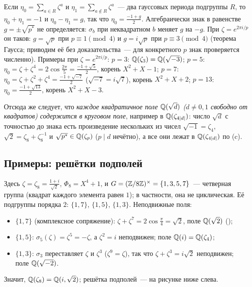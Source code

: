 Если $\eta_0=\sum_{a\in R}\zeta^a$ и $\eta_1=\sum_{a\notin R}\zeta^a$~--- два гауссовых периода подгруппы $R$, то
$\eta_0+\eta_1=-1$ и $\eta_0-\eta_1=g$, так что $\eta_0=\frac{-1+g}2$. Алгебраически знак в равенстве
$g=\pm\sqrt{p^*}$ не определяется: $\sigma_b$ при неквадратном $b$ меняет $g$ на $-g$. При $\zeta=e^{2\pi i/p}$ он таков:
$g=\sqrt p$ при $p\equiv1\pmod4$ и $g=i\sqrt p$ при $p\equiv3\pmod4$ (теорема Гаусса; приводим её без доказательства~---
для конкретного $p$ знак проверяется численно). Примеры при $\zeta=e^{2\pi i/p}$: $p=3$: $\mathbb Q(\zeta_3)=\mathbb Q(\sqrt{-3})$; $p=5$:
$\eta_0=\zeta+\zeta^4=2\cos\frac{2\pi}5=\frac{-1+\sqrt5}2$, корень $X^2+X-1$; $p=7$: $\eta_0=\zeta+\zeta^2+\zeta^4=\frac{-1+\sqrt{-7}}2$
($\sqrt{-7}=i\sqrt7$), корень $X^2+X+2$; $p=13$: $\eta_0=\frac{-1+\sqrt{13}}2$, корень $X^2+X-3$.

Отсюда же следует, что \emph{каждое квадратичное поле $\mathbb Q(\sqrt d)$ ($d\ne0,1$ свободно от квадратов) содержится в
круговом поле}, например в $\mathbb Q(\zeta_{4|d|})$: число $\sqrt d$ с точностью до знака есть произведение нескольких из чисел
$\sqrt{-1}=\zeta_4$, $\sqrt2=\zeta_8+\zeta_8^{-1}$ и $\sqrt{p^*}\in\mathbb Q(\zeta_p)$ ($p\mid d$ нечётно), а все они лежат в
$\mathbb Q(\zeta_{4|d|})$ по (c).

\subsection*{Примеры: решётки подполей}

\begin{example}[5.11g: $\Q(\zeta_8)$]
Здесь $\zeta=\zeta_8=\frac{1+i}{\sqrt2}$, $\Phi_8=X^4+1$, и $G=(\mathbb Z/8\mathbb Z)^\times=\{1,3,5,7\}$~--- четверная группа (квадрат каждого
элемента равен $1$); в частности, она не циклическая. Её подгруппы порядка $2$: $\{1,7\}$, $\{1,5\}$, $\{1,3\}$. Неподвижные
поля:
\begin{itemize}[leftmargin=*]
\item $\{1,7\}$ (комплексное сопряжение): $\zeta+\zeta^7=2\cos\frac\pi4=\sqrt2$, поле $\mathbb Q(\sqrt2)$ ();
\item $\{1,5\}$: $\sigma_5(\zeta)=\zeta^5=-\zeta$, а $\zeta^2=i$ неподвижен; поле $\mathbb Q(i)=\mathbb Q(\zeta_4)$;
\item $\{1,3\}$: $\sigma_3$ переставляет $\zeta$ и $\zeta^3$ ($\zeta^9=\zeta$), так что $\zeta+\zeta^3=i\sqrt2$ неподвижен; поле
$\mathbb Q(\sqrt{-2})$.
\end{itemize}
Значит, $\mathbb Q(\zeta_8)=\mathbb Q(i,\sqrt2)$; решётка подполей~--- на рисунке ниже слева.
\end{example}

